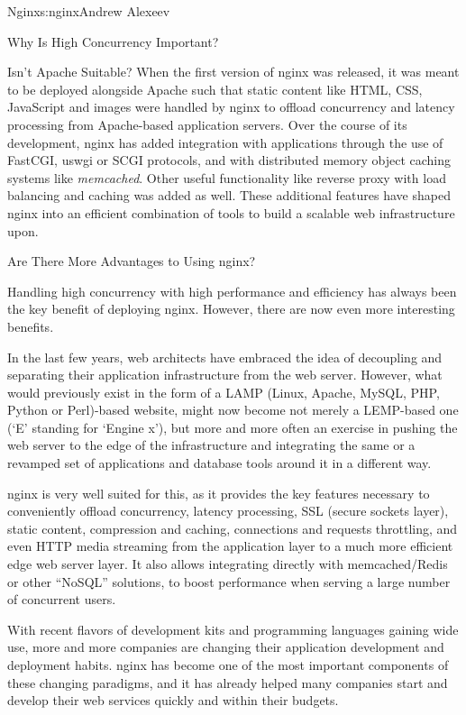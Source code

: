 \begin{aosachapter}{Nginx}{s:nginx}{Andrew Alexeev}
\begin{aosasect1}{Why Is High Concurrency Important?}
\begin{aosasect2}{Isn't Apache Suitable?}
When the first version of nginx was released, it was meant to be
deployed alongside Apache such that static content like HTML, CSS,
JavaScript and images were handled by nginx to offload concurrency and
latency processing from Apache-based application servers. Over the
course of its development, nginx has added integration with
applications through the use of FastCGI, uswgi or SCGI protocols, and
with distributed memory object caching systems like
\emph{memcached}. Other useful functionality like reverse proxy with
load balancing and caching was added as well. These additional
features have shaped nginx into an efficient combination of tools
to build a scalable web infrastructure upon.

\end{aosasect2}

\begin{aosasect2}{Are There More Advantages to Using nginx?}

Handling high concurrency with high performance and efficiency has
always been the key benefit of deploying nginx. However, there
are now even more interesting benefits.

In the last few years, web architects have embraced the idea of
decoupling and separating their application infrastructure from the
web server. However, what would previously exist in the form of a LAMP
(Linux, Apache, MySQL, PHP, Python or Perl)-based website, might now
become not merely a LEMP-based one (`E' standing for `Engine
x'), but more and more often an exercise in pushing the web server to
the edge of the infrastructure and integrating the same or a revamped
set of applications and database tools around it in a different way.

nginx is very well suited for this, as it provides the key features
necessary to conveniently offload concurrency, latency processing, SSL
(secure sockets layer), static content, compression and caching,
connections and requests throttling, and even HTTP media streaming
from the application layer to a much more efficient edge web server
layer. It also allows integrating directly with memcached/Redis or
other ``NoSQL'' solutions, to boost performance when serving a large
number of concurrent users.

With recent flavors of development kits and programming languages
gaining wide use, more and more companies are changing their
application development and deployment habits. nginx has become one of
the most important components of these changing paradigms, and it
has already helped many companies start and develop their web services
quickly and within their budgets.


\end{aosasect2}
\end{aosasect1}
\end{aosachapter}
